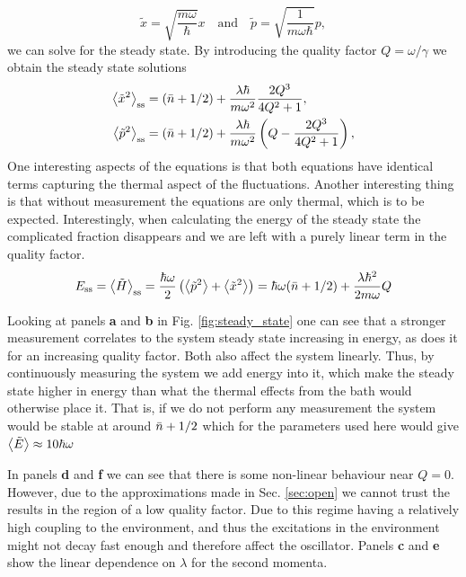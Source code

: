 \begin{equation}
    \tilde{x} = \sqrt{\frac{m\omega}{\hbar}} x \quad \text{and} \quad \tilde{p} = \sqrt{\frac{1}{m \omega \hbar}} p ,
\end{equation}
we can solve for the steady state. By introducing the quality factor $Q = \omega / \gamma$ we obtain the steady state solutions
\begin{align}
    \expval{\tilde{x}^2}_\mathrm{ss} &= (\bar{n} + 1/2) + \frac{\lambda \hbar}{m \omega^2} \frac{2 Q^3}{4Q^2 + 1}, \label{eq:x2ss}\\
    \expval{\tilde{p}^2}_\mathrm{ss} &= (\bar{n} + 1/2) + \frac{\lambda \hbar}{m \omega^2} \left( Q - \frac{2Q^3}{4Q^2 + 1} \right) \label{eq:p2ss},\\
\end{align}
One interesting aspects of the equations is that both equations have identical terms capturing the thermal aspect of the fluctuations. Another interesting thing is that without measurement the equations are only thermal, which is to be expected. Interestingly, when calculating the energy of the steady state the complicated fraction disappears and we are left with a purely linear term in the quality factor.
\begin{equation}
    E_\mathrm{ss} = \expval{\tilde{H}}_\mathrm{ss} = \frac{\hbar \omega}{2} \left( \expval{\tilde{p}^2} + \expval{\tilde{x}^2} \right) = \hbar\omega (\bar{n} + 1/2)+ \frac{\lambda \hbar^2}{2 m\omega} Q
    \label{eq:ess}
\end{equation}



Looking at panels \textbf{a} and \textbf{b} in Fig. \ref{fig:steady_state} one can see that a stronger measurement correlates to the system steady state increasing in energy, as does it for an increasing quality factor. Both also affect the system linearly. Thus, by continuously measuring the system we add energy into it, which make the steady state higher in energy than what the thermal effects from the bath would otherwise place it. That is, if we do not perform any measurement the system would be stable at around $\bar{n} + 1/2$ which for the parameters used here would give $\expval{\tilde{E}} \approx 10\hbar\omega$

In panels \textbf{d} and \textbf{f} we can see that there is some non-linear behaviour near $Q = 0$. However, due to the approximations made in Sec. \ref{sec:open} we cannot trust the results in the region of a low quality factor. Due to this regime having a relatively high coupling to the environment, and thus the excitations in the environment might not decay fast enough and therefore affect the oscillator. Panels \textbf{c} and \textbf{e} show the linear dependence on $\lambda$ for the second momenta.

